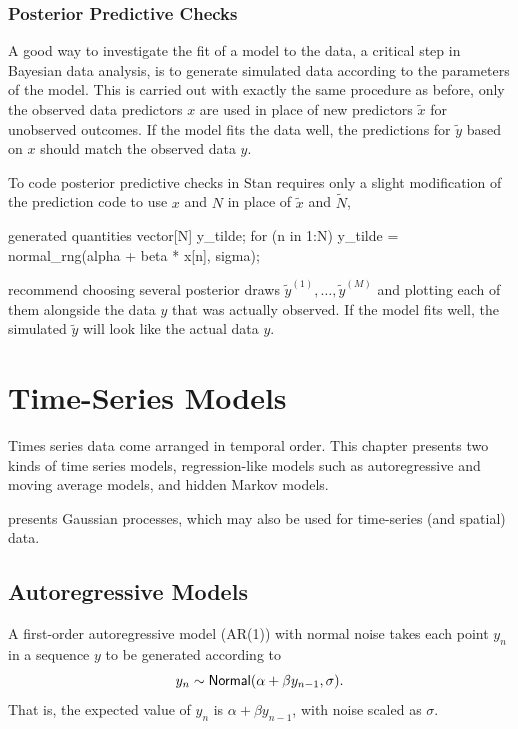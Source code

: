 \subsection{Posterior Predictive Checks}

A good way to investigate the fit of a model to the data, a critical
step in Bayesian data analysis, is to generate simulated data
according to the parameters of the model.  This is carried out with
exactly the same procedure as before, only the observed data
predictors $x$ are used in place of new predictors $\tilde{x}$ for
unobserved outcomes.  If the model fits the data well, the predictions
for $\tilde{y}$ based on $x$ should match the observed data $y$.

To code posterior predictive checks in Stan requires only a slight
modification of the prediction code to use $x$ and $N$ in place of
$\tilde{x}$ and $\tilde{N}$,
%
\begin{stancode}
generated quantities {
  vector[N] y_tilde;
  for (n in 1:N)
    y_tilde = normal_rng(alpha + beta * x[n], sigma);
}
\end{stancode}
%
\cite{GelmanEtAl:2013} recommend choosing several posterior draws
$\tilde{y}^{(1)}, \ldots, \tilde{y}^{(M)}$ and plotting each of them
alongside the data $y$ that was actually observed.  If the model fits
well, the simulated $\tilde{y}$ will look like the actual data $y$.




\chapter{Time-Series Models}

\noindent
Times series data come arranged in temporal order.  This chapter
presents two kinds of time series models, regression-like models such
as autoregressive and moving average models, and hidden Markov models. 

 presents Gaussian processes, which may
also be used for time-series (and spatial) data.


\section{Autoregressive Models}

A first-order autoregressive model (AR(1)) with normal noise takes
each point $y_n$ in a sequence $y$ to be generated according to
%
\[
y_n \sim \distro{Normal}(\alpha + \beta y_{n-1}, \sigma).
\]
%
That is, the expected value of $y_n$ is $\alpha + \beta y_{n-1}$, with
noise scaled as $\sigma$.


